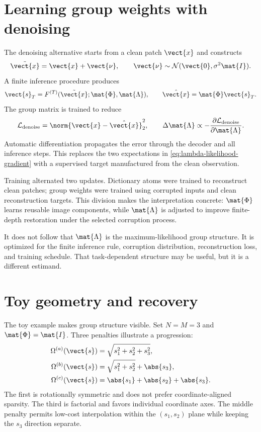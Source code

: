 \section{Learning group weights with denoising}
\label{sec:group-denoising}

The denoising alternative starts from a clean patch $\vect{x}$ and constructs
\begin{equation}
\label{eq:group-corruption}
\tilde{\vect{x}}=\vect{x}+\vect{\nu},
\qquad
\vect{\nu}\sim\mathcal{N}(\vect{0},\sigma^2\mat{I}).
\end{equation}
A finite inference procedure produces
\begin{equation}
\vect{s}_T
=F^{(T)}(\tilde{\vect{x}};\mat{\Phi},\mat{\Lambda}),
\qquad
\hat{\vect{x}}=\mat{\Phi}\vect{s}_T.
\end{equation}
The group matrix is trained to reduce
\begin{equation}
\label{eq:group-denoising-loss}
\mathcal{L}_{\mathrm{denoise}}
=\norm{\vect{x}-\hat{\vect{x}}}_2^2,
\qquad
\Delta\mat{\Lambda}\propto
-\frac{\partial\mathcal{L}_{\mathrm{denoise}}}
{\partial\mat{\Lambda}}.
\end{equation}
Automatic differentiation propagates the error through the decoder and all inference steps. This replaces the two expectations in \cref{eq:lambda-likelihood-gradient} with a supervised target manufactured from the clean observation.

Training alternated two updates. Dictionary atoms were trained to reconstruct clean patches; group weights were trained using corrupted inputs and clean reconstruction targets. This division makes the interpretation concrete: $\mat{\Phi}$ learns reusable image components, while $\mat{\Lambda}$ is adjusted to improve finite-depth restoration under the selected corruption process.

It does not follow that $\mat{\Lambda}$ is the maximum-likelihood group structure. It is optimized for the finite inference rule, corruption distribution, reconstruction loss, and training schedule. That task-dependent structure may be useful, but it is a different estimand.

\section{Toy geometry and recovery}
\label{sec:group-toy}

The toy example makes group structure visible. Set $N=M=3$ and $\mat{\Phi}=\mat{I}$. Three penalties illustrate a progression:
\begin{align}
\Omega^{(a)}(\vect{s})&=\sqrt{s_1^2+s_2^2+s_3^2},\\
\Omega^{(b)}(\vect{s})&=\sqrt{s_1^2+s_2^2}+\abs{s_3},\\
\Omega^{(c)}(\vect{s})&=\abs{s_1}+\abs{s_2}+\abs{s_3}.
\end{align}
The first is rotationally symmetric and does not prefer coordinate-aligned sparsity. The third is factorial and favors individual coordinate axes. The middle penalty permits low-cost interpolation within the $(s_1,s_2)$ plane while keeping the $s_3$ direction separate.

